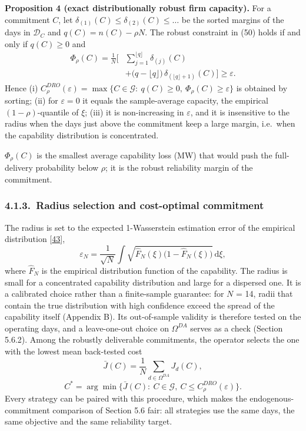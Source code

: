 \documentclass[a4paper,twocolumn,fleqn,10pt]{article}
\begin{document}
\textbf{Proposition 4 (exact distributionally robust firm capacity).} For a commitment \(C\), let \(\delta_{(1)}(C)\le\delta_{(2)}(C)\le\dots\) be the sorted margins of the days in \(\mathcal D_C\) and \(q(C)=n(C)-\rho N\). The robust constraint in (50) holds if and only if \(q(C)\ge0\) and \[\begin{aligned}\Phi_\rho(C)=\frac1N\Big[&\sum_{j=1}^{\lfloor q\rfloor}\delta_{(j)}(C)\\&+\big(q-\lfloor q\rfloor\big)\,\delta_{(\lfloor q\rfloor+1)}(C)\Big]\ge\varepsilon .\end{aligned} \tag{54}\] Hence (i) \(C^{DRO}_\rho(\varepsilon)=\max\{C\in\mathcal G:\ q(C)\ge0,\ \Phi_\rho(C)\ge\varepsilon\}\) is obtained by sorting; (ii) for \(\varepsilon=0\) it equals the sample-average capacity, the empirical \((1-\rho)\)-quantile of \(\xi\); (iii) it is non-increasing in \(\varepsilon\), and it is insensitive to the radius when the days just above the commitment keep a large margin, i.e.~when the capability distribution is concentrated.

\(\Phi_\rho(C)\) is the smallest average capability loss (MW) that would push the full-delivery probability below \(\rho\); it is the robust reliability margin of the commitment.

\subsubsection*{4.1.3.~Radius selection and cost-optimal commitment}

The radius is set to the expected 1-Wasserstein estimation error of the empirical distribution [\hyperlink{ref43}{43}], \[\varepsilon_N=\frac{1}{\sqrt N}\int\sqrt{\hat F_N(\xi)\big(1-\hat F_N(\xi)\big)}\,\mathrm d\xi, \tag{55}\] where \(\hat F_N\) is the empirical distribution function of the capability. The radius is small for a concentrated capability distribution and large for a dispersed one. It is a calibrated choice rather than a finite-sample guarantee: for \(N\) = 14, radii that contain the true distribution with high confidence exceed the spread of the capability itself (Appendix B). Its out-of-sample validity is therefore tested on the operating days, and a leave-one-out choice on \(\Omega^{DA}\) serves as a check (Section 5.6.2). Among the robustly deliverable commitments, the operator selects the one with the lowest mean back-tested cost \[\bar J(C)=\frac1N\sum_{d\in\Omega^{DA}}J_d(C), \tag{56}\] \[C^*=\arg\min\big\{\bar J(C):\ C\in\mathcal G,\ C\le C^{DRO}_\rho(\varepsilon)\big\}. \tag{57}\] Every strategy can be paired with this procedure, which makes the endogenous-commitment comparison of Section 5.6 fair: all strategies use the same days, the same objective and the same reliability target.
\end{document}
